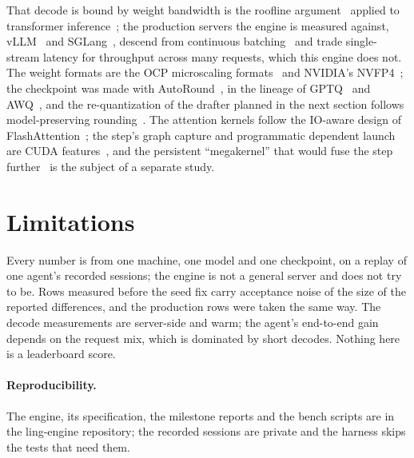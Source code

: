 \documentclass[11pt]{article}
\begin{document}
That decode is bound by weight bandwidth is the roofline argument~\cite{williams2009roofline} applied to transformer
inference~\cite{pope2022scaling}; the production servers the engine is measured against, vLLM~\cite{kwon2023vllm} and
SGLang~\cite{zheng2023sglang}, descend from continuous batching~\cite{yu2022orca} and trade single-stream latency for
throughput across many requests, which this engine does not. The weight formats are the OCP microscaling
formats~\cite{ocpmx2023} and NVIDIA's NVFP4~\cite{nvfp4blog}; the checkpoint was made with AutoRound~\cite{cheng2023autoround},
in the lineage of GPTQ~\cite{frantar2022gptq} and AWQ~\cite{lin2023awq}, and the re-quantization of the drafter planned in
the next section follows model-preserving rounding~\cite{tseng2025mpar}. The attention kernels follow the IO-aware
design of FlashAttention~\cite{dao2022flashattention,dao2023flashattention2}; the step's graph capture and programmatic
dependent launch are CUDA features~\cite{cudaguide}, and the persistent ``megakernel'' that would fuse the step
further~\cite{spector2025megakernel} is the subject of a separate study.

\section{Limitations}

Every number is from one machine, one model and one checkpoint, on a replay of one agent's recorded sessions; the engine
is not a general server and does not try to be. Rows measured before the seed fix carry acceptance noise of the size of the
reported differences, and the production rows were taken the same way. The decode measurements are server-side and warm;
the agent's end-to-end gain depends on the request mix, which is dominated by short decodes. Nothing here is a leaderboard
score.

\paragraph{Reproducibility.}
The engine, its specification, the milestone reports and the bench scripts are in the ling-engine repository; the
recorded sessions are private and the harness skips the tests that need them.



\end{document}
